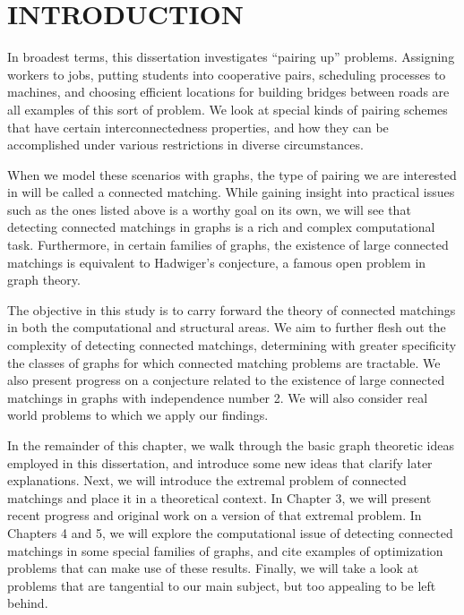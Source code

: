 \chapter{INTRODUCTION}



In broadest terms, this dissertation investigates ``pairing up'' problems.  Assigning workers to jobs, putting students into cooperative pairs, scheduling processes to machines, and choosing efficient locations for building bridges between roads are all examples of this sort of problem.  We look at special kinds of pairing schemes that have certain interconnectedness properties, and how they can be accomplished under various restrictions in diverse circumstances.  

When we model these scenarios with graphs, the type of pairing we are interested in will be called a connected matching.  While gaining insight into practical issues such as the ones listed above is a worthy goal on its own, we will see that detecting connected matchings in graphs is a rich and complex computational task.  Furthermore, in certain families of graphs, the existence of large connected matchings is equivalent to Hadwiger's conjecture, a famous open problem in graph theory.  
  
		

The objective in this study is to carry forward the theory of connected matchings in both the computational and structural areas.  We aim to further flesh out the complexity of detecting connected matchings, determining with greater specificity the classes of graphs for which connected matching problems are tractable.  We also present progress on a conjecture related to the existence of large connected matchings in graphs with independence number 2.  We will also consider real world problems to which we apply our findings.



In the remainder of this chapter, we walk through the basic graph theoretic ideas employed in this dissertation, and introduce some new ideas that clarify later explanations.  Next, we will introduce the extremal problem of connected matchings and place it in a theoretical context.  In Chapter 3, we will present recent progress and original work on a version of that extremal problem.  In Chapters 4 and 5, we will explore the computational issue of detecting connected matchings in some special families of graphs, and cite examples of optimization problems that can make use of these results.  Finally, we will take a look at problems that are tangential to our main subject, but too appealing to be left behind.     

